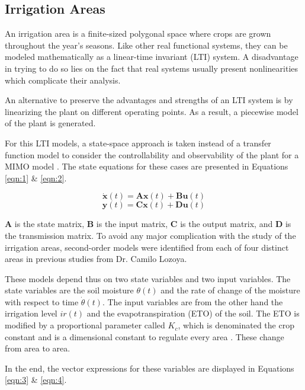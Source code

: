 \documentclass[12pt]{article}
\begin{document}
\subsection{Irrigation Areas}

An irrigation area is a finite-sized polygonal space where crops are grown throughout the year’s seasons. Like other real functional systems, they can be modeled mathematically as a linear-time invariant (LTI) system. A disadvantage in trying to do so lies on the fact that real systems usually present nonlinearities which complicate their analysis.

An alternative to preserve the advantages and strengths of an LTI system is by linearizing the plant on different operating points. As a result, a piecewise model of the plant is generated.

For this LTI models, a state-space approach is taken instead of a transfer function model to consider the controllability and observability of the plant for a MIMO model \cite{ogata}. The state equations for these cases are presented in Equations \ref{eqn:1} \& \ref{eqn:2}.

\begin{equation}
\label{eqn:1}
\mathbf{\dot{x}}(t) = \mathbf{A x}(t) + \mathbf{B u}(t)
\end{equation}
\begin{equation}
\label{eqn:2}
\mathbf{y}(t) = \mathbf{C x}(t) + \mathbf{D u}(t)
\end{equation}

$\mathbf{A}$ is the state matrix, $\mathbf{B}$ is the input matrix, $\mathbf{C}$ is the output matrix, and $\mathbf{D}$ is the transmission matrix. To avoid any major complication with the study of the irrigation areas, second-order models were identified from each of four distinct areas in previous studies from Dr. Camilo Lozoya.

These models depend thus on two state variables and two input variables. The state variables are the soil moisture $\theta(t)$ and the rate of change of the moisture with respect to time $\dot{\theta}(t)$. The input variables are from the other hand the irrigation level $ir(t)$ and the evapotranspiration (ETO) of the soil. The ETO is modified by a proportional parameter called $K_c$, which is denominated the crop constant and is a dimensional constant to regulate every area \cite{camilo2}. These change from area to area.

In the end, the vector expressions for these variables are displayed in Equations \ref{eqn:3} \& \ref{eqn:4}.
\end{document}
